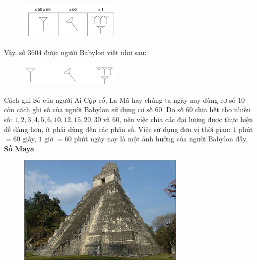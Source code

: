 \begin{multicols}{2}
\begin{figure}[H]
		\centering
		\vspace*{-5pt}
		\captionsetup{labelformat= empty, justification=centering}
		\includegraphics[width=0.65\linewidth]{26}
		\vspace*{-10pt}
	\end{figure}
	Vậy, số $3604$ được người Babylon viết như sau:
	\begin{figure}[H]
		\centering
		\captionsetup{labelformat= empty, justification=centering}
		\includegraphics[width=0.75\linewidth]{27}
		\vspace*{-10pt}
	\end{figure}
	Cách ghi Số của người Ai Cập cổ, La Mã hay chúng ta ngày nay dùng cơ số $10$ còn cách ghi số của người Babylon sử dụng cơ số $60$. Do số $60$ chia hết cho nhiều số: $1,2,3,4,5,6, 10, 12, 15, 20,30$ và $60$, nên việc chia các đại lượng được thực hiện dễ dàng hơn, ít phải dùng đến các phân số. Việc sử dụng đơn vị thời gian: $1$ phút $= 60$ giây, $1$ giờ $= 60$ phút ngày nay là một ảnh hưởng của người Babylon đấy.
	\vskip 0.1cm
	\textbf{\color{toancuabi}Số Maya}
	\vskip 0.1cm
	\begin{figure}[H]
		\centering
		\vspace*{-10pt}
		\captionsetup{labelformat= empty, justification=centering}
		\includegraphics[width=1\linewidth]{28}

\end{figure}
\end{multicols}
